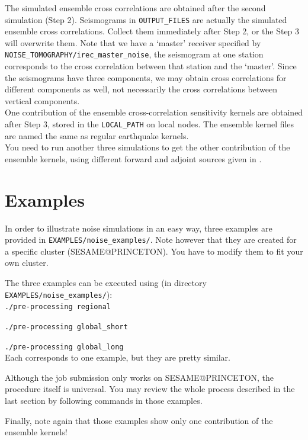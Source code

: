 \documentclass[oneside,english]{book}
\begin{document}
The simulated ensemble cross correlations are obtained after the second simulation (Step 2).
Seismograms in \texttt{OUTPUT\_FILES} are actually the simulated ensemble cross correlations.
Collect them immediately after Step 2, or the Step 3 will overwrite them.
Note that we have a `master' receiver specified by \texttt{NOISE\_TOMOGRAPHY/irec\_master\_noise},
the seismogram at one station corresponds to the cross correlation between that station and the `master'.
Since the seismograms have three components, we may obtain cross correlations
for different components as well, not necessarily the cross correlations between vertical components.\\

One contribution of the ensemble cross-correlation sensitivity kernels are obtained after Step 3,
stored in the \texttt{LOCAL\_PATH} on local nodes.
The ensemble kernel files are named the same as regular earthquake kernels.\\

You need to run another three simulations to get the other contribution of the ensemble kernels,
using different forward and adjoint sources given in \citet{trompetal2010}.

\section{Examples}

In order to illustrate noise simulations in an easy way, three examples are provided in
\texttt{EXAMPLES/noise\_examples/}. 
Note however that they are created for a specific cluster (SESAME@PRINCETON).
You have to modify them to fit your own cluster.

The three examples can be executed using (in directory \texttt{EXAMPLES/noise\_examples/}):\\

\texttt{./pre-processing regional}

\texttt{./pre-processing global\_short}

\texttt{./pre-processing global\_long}\\

Each corresponds to one example, but they are pretty similar.

Although the job submission only works on SESAME@PRINCETON, the procedure itself is universal.
You may review the whole process described in the last section by following commands in those examples.

Finally, note again that those examples show only one contribution of the ensemble kernels!
\end{document}
